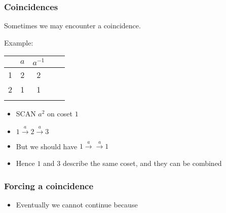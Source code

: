\documentclass{beamer}
\begin{document}
\begin{frame}
  \frametitle{Coincidences}
  Sometimes we may encounter a coincidence.

  Example:
  \begin{table}
    \begin{tabular}{r | c c c c}
      & $a$ & $a^{-1}$ \\ \hline
      1 & 2 & 2\\
      2 & \phantom{3} 1 \phantom{1} & 1 \\ \\
    \end{tabular}
  \end{table}
  
  \begin{itemize}
  \item SCAN $a^2$ on coset $1$ 
  \item $ 1 \overset{a}{\rightarrow} 2 \overset{a}{\rightarrow} 3$ 
  \item But we should have $ 1 \overset{a}{\rightarrow} \overset{a}{\rightarrow} 1$ 
  \item Hence $1$ and $3$ describe the same coset, and they can be combined
  \end{itemize}
\end{frame}

\begin{frame}
  \frametitle{Forcing a coincidence}
  \begin{itemize}
  \item Eventually we cannot continue because
  \end{itemize}
\end{frame}
\end{document}

